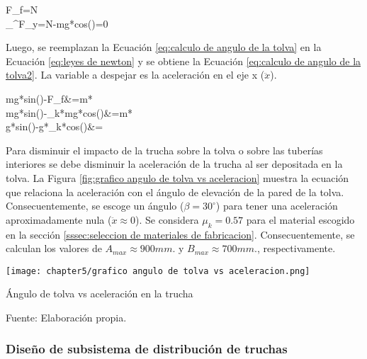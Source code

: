 \begin{myequation}\label{eq:calculo de angulo de la tolva}
	\begin{split}
		F_{f}=\mu*N  \\
		\sum_{}^{}F_{y}=N-mg*cos(\beta)=0
	\end{split}
\end{myequation}

Luego, se reemplazan la Ecuación \ref{eq:calculo de angulo de la tolva} en la Ecuación \ref{eq:leyes de newton} y se obtiene la Ecuación \ref{eq:calculo de angulo de la tolva2}. La variable a despejar es la aceleración en el eje x ($\ddot{x}$).

\begin{myequation}\label{eq:calculo de angulo de la tolva2}
	\begin{split}
		mg*sin(\beta)-F_{f}&=m*\ddot{x} \\
		mg*sin(\beta)-\mu_{k}*mg*cos(\beta)&=m*\ddot{x} \\
		g*sin(\beta)-g*\mu_{k}*cos(\beta)&=\ddot{x}
	\end{split}
\end{myequation}

Para disminuir el impacto de la trucha sobre la tolva o sobre las tuberías interiores se debe disminuir la aceleración de la trucha al ser depositada en la tolva. La Figura \ref{fig:grafico angulo de tolva vs aceleracion} muestra la ecuación que relaciona la aceleración con el ángulo de elevación de la pared de la tolva. Consecuentemente, se escoge un ángulo ($\beta=30^\circ$) para tener una aceleración aproximadamente nula ($\approx0$). Se considera $\mu_{k}=0.57$ para el material escogido en la sección \ref{sssec:seleccion de materiales de fabricacion}. Consecuentemente, se calculan los valores de $A_{max}\approx{900} mm.$ y $B_{max}\approx{700} mm.$, respectivamente.


\begin{myfigure}[H]
	\centering
	\texttt{[image: chapter5/grafico angulo de tolva vs aceleracion.png]}
	\caption{Ángulo de tolva vs aceleración en la trucha}
	\begin{myflushleftportland}
		Fuente: Elaboración propia.
	\end{myflushleftportland}
	\label{fig:grafico angulo de tolva vs aceleracion}
\end{myfigure}

\subsubsection{Diseño de subsistema de distribución de truchas}

